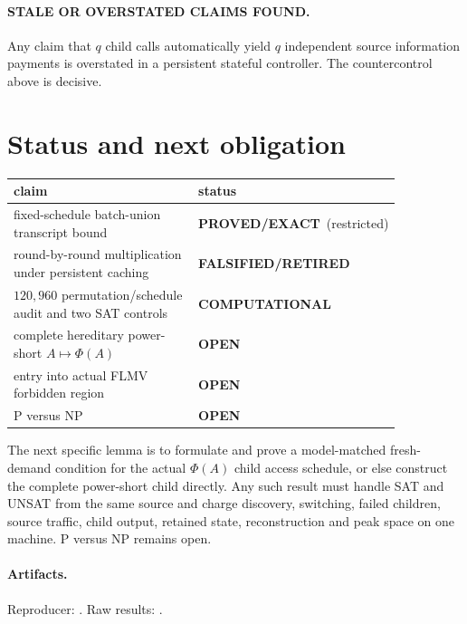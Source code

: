 \documentclass[11pt]{article}
\newcommand{\OPEN}{\textbf{OPEN}}
\newcommand{\EXACT}{\textbf{PROVED/EXACT}}
\newcommand{\COMP}{\textbf{COMPUTATIONAL}}
\newcommand{\RET}{\textbf{FALSIFIED/RETIRED}}
\begin{document}
\paragraph{STALE OR OVERSTATED CLAIMS FOUND.}
Any claim that $q$ child calls automatically yield $q$ independent source
information payments is overstated in a persistent stateful controller.  The
countercontrol above is decisive.

\section{Status and next obligation}
\begin{center}
\begin{tabular}{p{0.54\linewidth}p{0.31\linewidth}}
\toprule
claim & status\\
\midrule
fixed-schedule batch-union transcript bound & \EXACT\ (restricted)\\
round-by-round multiplication under persistent caching & \RET\\
$120{,}960$ permutation/schedule audit and two SAT controls & \COMP\\
complete hereditary power-short $A\mapsto\Phi(A)$ & \OPEN\\
entry into actual FLMV forbidden region & \OPEN\\
P versus NP & \OPEN\\
\bottomrule
\end{tabular}
\end{center}

The next specific lemma is to formulate and prove a model-matched fresh-demand
condition for the actual $\Phi(A)$ child access schedule, or else construct the
complete power-short child directly.  Any such result must handle SAT and UNSAT
from the same source and charge discovery, switching, failed children, source
traffic, child output, retained state, reconstruction and peak space on one
machine.  P versus NP remains open.

\paragraph{Artifacts.}
Reproducer:
.
Raw results:
.

\end{document}
